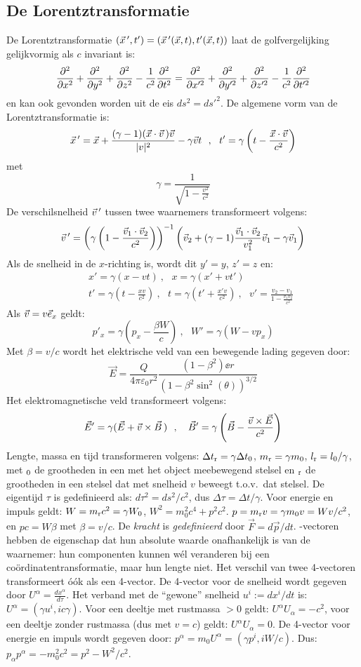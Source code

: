 \documentclass[twoside]{report}
\begin{document}
\subsection{De Lorentztransformatie}
De Lorentztransformatie $(\vec{x}\,',t')=(\vec{x}\,'(\vec{x},t),t'(\vec{x},t))$
laat de golfvergelijking gelijkvormig als $c$ invariant is:
\[
\frac{\partial^2 }{\partial x^2}+\frac{\partial^2 }{\partial y^2}+\frac{\partial^2 }{\partial z^2}-\frac{1}{c^2}\frac{\partial^2 }{\partial t^2}=
\frac{\partial^2 }{\partial x'^2}+\frac{\partial^2 }{\partial y'^2}+\frac{\partial^2 }{\partial z'^2}-\frac{1}{c^2}\frac{\partial^2 }{\partial t'^2}
\]
en kan ook gevonden worden uit de eis $ds^2=ds'^2$. De algemene vorm van de
Lorentztransformatie is:
\[
\vec{x}\,'=\vec{x}+\frac{(\gamma-1)(\vec{x}\cdot\vec{v}\,)\vec{v}}{|v|^2}-\gamma\vec{v} t~~,~~
t'=\gamma\left(t-\frac{\vec{x}\cdot\vec{v}}{c^2}\right)
\]
met
\[
\gamma=\frac{1}{\sqrt{1-\frac{\displaystyle v^2}{\displaystyle c^2}}}
\]
De verschilsnelheid $\vec{v}\,'$ tussen twee waarnemers transformeert volgens:
\[
\vec{v}\,'=\left(\gamma\left(1-\frac{\vec{v}_1\cdot\vec{v}_2}{c^2}\right)\right)^{-1}
\left(\vec{v}_2+(\gamma-1)\frac{\vec{v}_1\cdot\vec{v}_2}{v_1^2}\vec{v}_1-\gamma\vec{v}_1\right)
\]
Als de snelheid in de $x$-richting is, wordt dit $y'=y$, $z'=z$ en:
\begin{eqnarray*}
&&x'=\gamma(x-vt)~,~~~x=\gamma(x'+vt')\\
&&t'=\gamma\left(t-\displaystyle\frac{xv}{c^2}\right)~,~~~t=\gamma\left(t'+\displaystyle\frac{x'v}{c^2}\right)~,~~~
v'=\frac{\displaystyle v_2-v_1}{\displaystyle 1-\frac{v_1v_2}{c^2}}
\end{eqnarray*}
Als $\vec{v}=v\vec{e}_x$ geldt:
\[
p'_x=\gamma\left(p_x-\frac{\beta W}{c}\right)~,~~~W'=\gamma(W-vp_x)
\]
Met $\beta=v/c$ wordt het elektrische veld van een bewegende lading gegeven
door:
\[
\vec{E}=\frac{Q}{4\pi\varepsilon_0r^2}\frac{(1-\beta^2)\ee{r}}{(1-\beta^2\sin^2(\theta))^{3/2}}
\]
Het elektromagnetische veld transformeert volgens:
\[
\vec{E}'=\gamma(\vec{E}+\vec{v}\times\vec{B}\,)~~,~~~
\vec{B}'=\gamma\left(\vec{B}-\frac{\vec{v}\times\vec{E}}{c^2}\right)
\]
Lengte, massa en tijd transformeren volgens:
$\Delta t_{\rm r}=\gamma\Delta t_{\rm 0}$, $m_{\rm r}=\gamma m_0$,
$l_{\rm r}=l_0/\gamma$, met $_{\rm 0}$ de grootheden in een met het object
meebewegend stelsel en $_{\rm r}$ de grootheden in een stelsel dat met
snelheid $v$ beweegt t.o.v.\ dat stelsel. De eigentijd $\tau$ is gedefinieerd
als: $d\tau^2=ds^2/c^2$, dus $\Delta\tau=\Delta t/\gamma$. Voor energie en
impuls geldt: $W=m_{\rm r}c^2=\gamma W_0$, $W^2=m_0^2c^4+p^2c^2$. $p=m_{\rm
r}v=\gamma m_0v=Wv/c^2$, en $pc=W\beta$ met $\beta=v/c$. De {\it kracht} is
{\it gedefinieerd} door $\vec{F}=d\vec{p}/dt$.
-vectoren hebben de eigenschap dat hun absolute waarde onafhankelijk is
van de waarnemer: hun componenten kunnen w\'el veranderen bij een
co\"ordinatentransformatie, maar hun lengte niet. Het verschil van twee
4-vectoren transformeert \'o\'ok als een 4-vector. De 4-vector voor de
snelheid wordt gegeven door $\displaystyle U^\alpha=\frac{dx^\alpha}{d\tau}$.
Het verband met de ``gewone'' snelheid $u^i:=dx^i/dt$ is:
$U^\alpha=(\gamma u^i,ic\gamma)$. Voor een deeltje met rustmassa $>0$ geldt:
$U^\alpha U_\alpha=-c^2$, voor een deeltje zonder rustmassa (dus met $v=c$)
geldt: $U^\alpha U_\alpha=0$. De 4-vector voor energie en impuls wordt
gegeven door: $p^\alpha=m_0U^\alpha=(\gamma p^i,iW/c)$. Dus:
$p_\alpha p^\alpha=-m_0^2c^2=p^2-W^2/c^2$.
\end{document}
